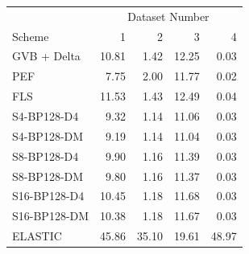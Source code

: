 \begin{tabular}{lrrrr}
\toprule
 & \multicolumn{4}{c}{Dataset Number} \\
Scheme & 1 & 2 & 3 & 4 \\
\midrule
GVB + Delta & 10.81 & 1.42 & 12.25 & 0.03 \\
PEF & 7.75 & 2.00 & 11.77 & 0.02 \\
FLS & 11.53 & 1.43 & 12.49 & 0.04 \\
S4-BP128-D4 & 9.32 & 1.14 & 11.06 & 0.03 \\
S4-BP128-DM & 9.19 & 1.14 & 11.04 & 0.03 \\
S8-BP128-D4 & 9.90 & 1.16 & 11.39 & 0.03 \\
S8-BP128-DM & 9.80 & 1.16 & 11.37 & 0.03 \\
S16-BP128-D4 & 10.45 & 1.18 & 11.68 & 0.03 \\
S16-BP128-DM & 10.38 & 1.18 & 11.67 & 0.03 \\
ELASTIC & 45.86 & 35.10 & 19.61 & 48.97 \\
\bottomrule
\end{tabular}
